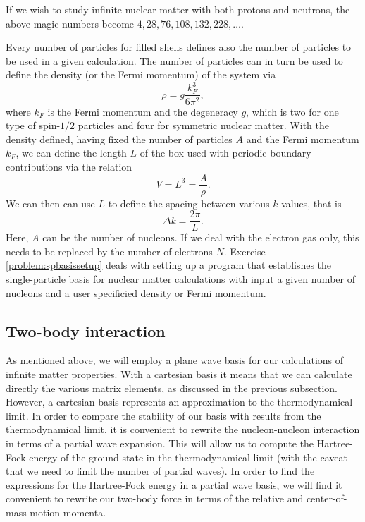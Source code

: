 If we wish to study infinite nuclear matter with both protons and
neutrons, the above magic numbers become $4, 28, 76, 108, 132, 228, \dots$.

Every number of particles for filled shells defines also the number of
particles to be used in a given calculation. The number of
particles can in turn be used to define the density (or the Fermi momentum) of the system via
\[
\rho = g \frac{k_F^3}{6\pi^2},
\]
where $k_F$ is the Fermi momentum and the degeneracy $g$, which is two
for one type of spin-$1/2$ particles and four for symmetric nuclear
matter.  With the density defined, having fixed the number of particles $A$ and the Fermi momentum $k_F$,
we can define the length $L$ of the box used with periodic
boundary contributions via the relation
\[
  V= L^3= \frac{A}{\rho}.
\]
We can then  can use $L$ to define the spacing between
various $k$-values, that is
\[
  \Delta k = \frac{2\pi}{L}.
\]
Here, $A$ can be the number of nucleons. If we deal with the electron
gas only, this needs to be replaced by the number of electrons $N$.
Exercise \ref{problem:spbasissetup} deals with setting up a program that establishes the   single-particle basis
for nuclear matter calculations with input a given number of nucleons and a user specificied 
density or Fermi momentum.


\subsection{Two-body interaction}

As mentioned above, we will employ a plane wave basis
for our calculations of infinite matter properties. With a cartesian
basis it means that we can calculate directly the various matrix
elements, as discussed in the previous subsection. However, a
cartesian basis represents an approximation to the thermodynamical limit. In
order to compare the stability of our basis with results from the
thermodynamical limit, it is convenient to rewrite the nucleon-nucleon
interaction in terms of a partial wave expansion. This will allow us
to compute the Hartree-Fock energy of the ground state in the
thermodynamical limit (with the caveat that we need to limit the
number of partial waves). In order to find the expressions for the
Hartree-Fock energy in a partial wave basis, we will find it
convenient to rewrite our two-body force in terms of the relative and
center-of-mass motion momenta.

